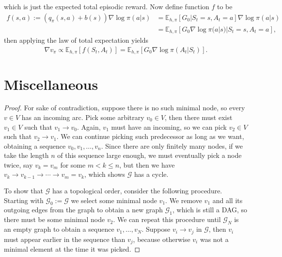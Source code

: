\documentclass[a4paper]{report}
\theoremstyle{definition}
\theoremstyle{plain}
\begin{document}
which is just the expected total episodic reward.
%
Now define function $f$ to be
\begin{subequations}
\begin{align}
  f(s, a) := (q_{\pi}(s, a) + b(s))\nabla \log \pi(a | s) &= \mathbb{E}_{h,\pi} \left[ G_{0} | S_{t} = s, A_{t} = a \right] \nabla \log \pi(a | s) \\
  &= \mathbb{E}_{h,\pi} \left[ G_{0} \nabla \log \pi(a | s) | S_{t} = s, A_{t} = a \right] ,
\end{align}
\end{subequations}
then applying the law of total expectation yields
\begin{align}
  \nabla v_{\pi} \propto \mathbb{E}_{h,\pi}[f(S_{t}, A_{t})] =  \mathbb{E}_{h, \pi} \left[ G_{0} \nabla \log \pi(A_{t} | S_{t}) \right] .
\end{align}


\chapter{Miscellaneous}\label{app:misc}

\minimalnode*
\begin{proof}
  For sake of contradiction, suppose there is no such minimal node, so every
  $v \in V$ has an incoming arc. Pick some arbitrary $v_0 \in V$, then there
  must exist $v_1 \in V$ such that $v_1 \rightarrow v_0$. Again, $v_1$ must have
  an incoming, so we can pick $v_2 \in V$ such that $v_2 \rightarrow v_1$. We
  can continue picking such predecessor as long as we want, obtaining a sequence
  $v_0, v_1, \dots, v_n$. Since there are only finitely many nodes, if we take
  the length $n$ of this sequence large enough, we must eventually pick a node
  twice, say $v_k = v_m$ for some $m < k \leq n$, but then we have
  $v_k \rightarrow v_{k-1} \rightarrow \cdots \rightarrow v_m = v_k$, which
  shows $\mathcal{G}$ has a cycle.

  To show that $\mathcal{G}$ has a topological order, consider the following
  procedure. Starting with $\mathcal{G}_0 := \mathcal{G}$ we select some minimal
  node $v_1$. We remove $v_1$ and all its outgoing edges from the graph to
  obtain a new graph $\mathcal{G}_1$, which is still a DAG, so there must be
  some minimal node $v_2$. We can repeat this procedure until
  $\mathcal{G}_{N}$ is an empty graph to obtain a sequence $v_1, \dots, v_N$.
  Suppose $v_i \rightarrow v_j$ in $\mathcal{G}$, then $v_i$ must appear earlier
  in the sequence than $v_j$, because otherwise $v_i$ was not a minimal element
  at the time it was picked.
\end{proof}
\end{document}
